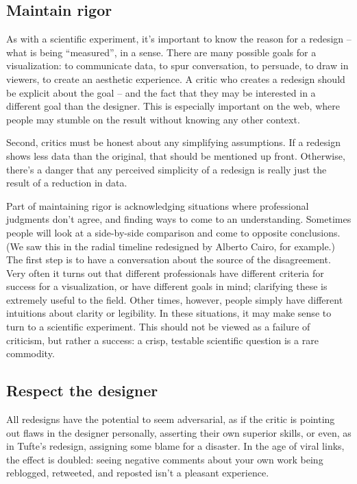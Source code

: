 \documentclass[sigconf,nonacm,screen,pbalance]{acmart}
\begin{document}
\subsection{Maintain rigor}
As with a scientific experiment, it's important to know the
reason for a redesign -- what is being ``measured'', in a sense. There are many possible
goals for a visualization: to communicate data, to spur conversation, to persuade, to draw
in viewers, to create an aesthetic experience. A critic who creates a redesign should be
explicit about the goal -- and the fact that they may be interested in a different goal
than the designer. This is especially important on the web, where people may stumble on
the result without knowing any other context.

Second, critics must be honest about any simplifying
assumptions. If a redesign shows less data than the original, that should be mentioned up
front. Otherwise, there's a danger that any perceived simplicity of a redesign is really
just the result of a reduction in data.

Part of maintaining rigor is acknowledging situations where
professional judgments don't agree, and finding ways to come to an understanding.
Sometimes people will look at a side-by-side comparison and come to opposite conclusions.
(We saw this in the radial timeline redesigned by Alberto Cairo, for example.) The first
step is to have a conversation about the source of the disagreement. Very often it turns
out that different professionals have different criteria for success for a visualization,
or have different goals in mind; clarifying these is extremely useful to the field. Other
times, however, people simply have different intuitions about clarity or legibility. In
these situations, it may make sense to turn to a scientific experiment. This should not be
viewed as a failure of criticism, but rather a success: a crisp, testable scientific
question is a rare commodity.

\subsection{Respect the designer}
All redesigns have the potential to seem adversarial, as if
the critic is pointing out flaws in the designer personally, asserting their own superior
skills, or even, as in Tufte's redesign, assigning some blame for a disaster. In the age
of viral links, the effect is doubled: seeing negative comments about your own work being
reblogged, retweeted, and reposted isn't a pleasant experience.
\end{document}
